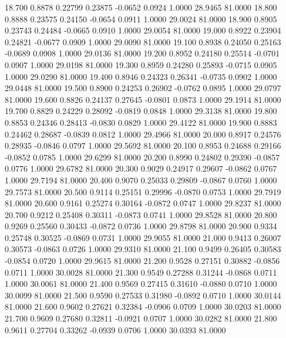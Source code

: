   18.700   0.8878   0.22799   0.23875  -0.0652   0.0924   1.0000  28.9465  81.0000
  18.800   0.8888   0.23575   0.24150  -0.0654   0.0911   1.0000  29.0024  81.0000
  18.900   0.8905   0.23743   0.24484  -0.0665   0.0910   1.0000  29.0054  81.0000
  19.000   0.8922   0.23904   0.24821  -0.0677   0.0909   1.0000  29.0090  81.0000
  19.100   0.8938   0.24050   0.25163  -0.0689   0.0908   1.0000  29.0136  81.0000
  19.200   0.8952   0.24180   0.25514  -0.0701   0.0907   1.0000  29.0198  81.0000
  19.300   0.8959   0.24280   0.25893  -0.0715   0.0905   1.0000  29.0290  81.0000
  19.400   0.8946   0.24323   0.26341  -0.0735   0.0902   1.0000  29.0448  81.0000
  19.500   0.8900   0.24253   0.26902  -0.0762   0.0895   1.0000  29.0797  81.0000
  19.600   0.8826   0.24137   0.27645  -0.0801   0.0873   1.0000  29.1914  81.0000
  19.700   0.8829   0.24229   0.28092  -0.0819   0.0848   1.0000  29.3138  81.0000
  19.800   0.8853   0.24346   0.28413  -0.0830   0.0829   1.0000  29.4122  81.0000
  19.900   0.8883   0.24462   0.28687  -0.0839   0.0812   1.0000  29.4966  81.0000
  20.000   0.8917   0.24576   0.28935  -0.0846   0.0797   1.0000  29.5692  81.0000
  20.100   0.8953   0.24688   0.29166  -0.0852   0.0785   1.0000  29.6299  81.0000
  20.200   0.8990   0.24802   0.29390  -0.0857   0.0776   1.0000  29.6782  81.0000
  20.300   0.9029   0.24917   0.29607  -0.0862   0.0767   1.0000  29.7194  81.0000
  20.400   0.9070   0.25033   0.29809  -0.0867   0.0760   1.0000  29.7573  81.0000
  20.500   0.9114   0.25151   0.29996  -0.0870   0.0753   1.0000  29.7919  81.0000
  20.600   0.9161   0.25274   0.30164  -0.0872   0.0747   1.0000  29.8237  81.0000
  20.700   0.9212   0.25408   0.30311  -0.0873   0.0741   1.0000  29.8528  81.0000
  20.800   0.9269   0.25560   0.30433  -0.0872   0.0736   1.0000  29.8798  81.0000
  20.900   0.9334   0.25748   0.30525  -0.0869   0.0731   1.0000  29.9055  81.0000
  21.000   0.9413   0.26007   0.30573  -0.0863   0.0726   1.0000  29.9310  81.0000
  21.100   0.9499   0.26405   0.30583  -0.0854   0.0720   1.0000  29.9615  81.0000
  21.200   0.9528   0.27151   0.30882  -0.0856   0.0711   1.0000  30.0028  81.0000
  21.300   0.9549   0.27288   0.31244  -0.0868   0.0711   1.0000  30.0061  81.0000
  21.400   0.9569   0.27415   0.31610  -0.0880   0.0710   1.0000  30.0099  81.0000
  21.500   0.9590   0.27533   0.31980  -0.0892   0.0710   1.0000  30.0144  81.0000
  21.600   0.9602   0.27621   0.32384  -0.0906   0.0709   1.0000  30.0203  81.0000
  21.700   0.9609   0.27680   0.32811  -0.0921   0.0707   1.0000  30.0282  81.0000
  21.800   0.9611   0.27704   0.33262  -0.0939   0.0706   1.0000  30.0393  81.0000
